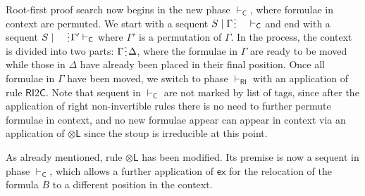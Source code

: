 \documentclass[submission,copyright,creativecommons]{eptcs}
\theoremstyle{definition}
\newcommand{\tl}{\otimes \mathsf{L}}
\newcommand{\C}{\mathsf{C}}
\newcommand{\RI}{\mathsf{RI}}
\newcommand{\ex}{\mathsf{ex}}
\newcommand{\spl}{\raisebox{-1.5pt}[0.5\height]{\hspace{1pt}\vdots\hspace{1pt}}}
\begin{document}
 Root-first proof search now begins in the new phase $\vdash_\C$, where formulae in context are permuted.
  We start with a sequent $S \mid \Gamma \spl \quad \vdash_{\C}$ and end with a sequent $S \mid \quad \spl \Gamma' \vdash_{\C}$ where $\Gamma'$ is a permutation of $\Gamma$.
  In the process, the context is divided into two parts: $\Gamma \spl \Delta$, where the formulae in $\Gamma$ are ready to be moved while those in $\Delta$ have already been placed in their final position.
  Once all formulae in $\Gamma$ have been moved, we switch to phase $\vdash_\RI$ with an application of rule $\RI 2 \C$. 
  Note that sequent in $\vdash_\C$ are not marked by list of tags, since after the application of right non-invertible rules there is no need to further permute formulae in context, and no new formulae appear can appear in context via an application of $\tl$ since the stoup is irreducible at this point.

  As already mentioned, rule $\tl$ has been modified. Its premise is now a sequent in phase $\vdash_\C$, which allows a further application of $\ex$ for the relocation of the formula $B$ to a different position in the context.
\end{document}
